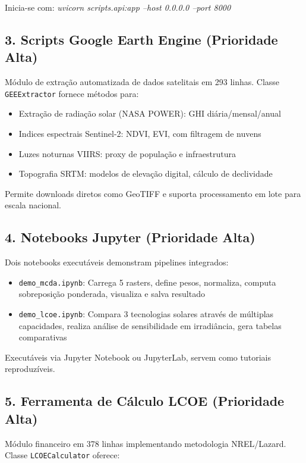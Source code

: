 \documentclass[12pt, a4paper]{article}
\begin{document}
Inicia-se com: \textit{uvicorn scripts.api:app --host 0.0.0.0 --port 8000}

\subsection{3. Scripts Google Earth Engine (Prioridade Alta)}

Módulo de extração automatizada de dados satelitais em 293 linhas. Classe \texttt{GEEExtractor} fornece métodos para:

\begin{itemize}
    \item Extração de radiação solar (NASA POWER): GHI diária/mensal/anual
    \item Indices espectrais Sentinel-2: NDVI, EVI, com filtragem de nuvens
    \item Luzes noturnas VIIRS: proxy de população e infraestrutura
    \item Topografia SRTM: modelos de elevação digital, cálculo de declividade
\end{itemize}

Permite downloads diretos como GeoTIFF e suporta processamento em lote para escala nacional.

\subsection{4. Notebooks Jupyter (Prioridade Alta)}

Dois notebooks executáveis demonstram pipelines integrados:

\begin{itemize}
    \item \texttt{demo\_mcda.ipynb}: Carrega 5 rasters, define pesos, normaliza, computa sobreposição ponderada, visualiza e salva resultado
    \item \texttt{demo\_lcoe.ipynb}: Compara 3 tecnologias solares através de múltiplas capacidades, realiza análise de sensibilidade em irradiância, gera tabelas comparativas
\end{itemize}

Executáveis via Jupyter Notebook ou JupyterLab, servem como tutoriais reproduzíveis.

\subsection{5. Ferramenta de Cálculo LCOE (Prioridade Alta)}

Módulo financeiro em 378 linhas implementando metodologia NREL/Lazard. Classe \texttt{LCOECalculator} oferece:
\end{document}
